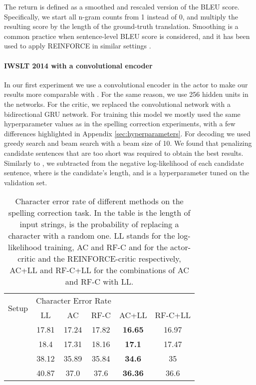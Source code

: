 \documentclass{article} \usepackage{iclr2017_conference,times}
\begin{document}
The return is defined as a smoothed and rescaled version of the BLEU score. Specifically,
we start all n-gram counts from 1 instead of 0, and multiply the resulting score
by the length of the ground-truth translation. Smoothing is a common practice when sentence-level
BLEU score is considered, and it has been used to apply REINFORCE in similar settings
\citep{ranzato2015sequence}.

\paragraph{IWSLT 2014 with a convolutional encoder}

In our first experiment we use a convolutional encoder in the actor to make our results more comparable with \citet{ranzato2015sequence}.
For the same reason, we use 256 hidden units in the  networks.
For the critic, we replaced the convolutional network with a bidirectional GRU network.
For training this model we mostly used the same hyperparameter values as in the spelling 
correction experiments, with a few differences highlighted in Appendix \ref{sec:hyperparameters}.
For decoding we used greedy search and beam search with a beam size of 10. We
found that penalizing
 candidate sentences that are too short was required to
obtain the best results. Similarly to \citep{hannun2014first},
 we subtracted
 from the negative log-likelihood of each candidate
 sentence, where
 is the candidate's length, and  is a hyperparameter
 tuned on the
validation set.


\begin{table}\centering
    \caption{Character error rate of different methods on the spelling correction task.
        In the table  is the length of input strings,  
        is the probability of replacing a character with a random one.
        LL stands for the log-likelihood training, AC and RF-C and for the actor-critic and the
        REINFORCE-critic respectively, AC+LL and RF-C+LL for the combinations of AC and RF-C with LL.}
    \begin{tabular}{l | c | c | c | c | c}
        \multirow{2}{*}{Setup} & \multicolumn{3}{|c}{Character Error Rate} \\
                               & LL & AC & RF-C & AC+LL & RF-C+LL \\
        \hline\hline
          & 17.81 & 17.24 & 17.82 & \textbf{16.65} & 16.97 \\
          & 18.4  & 17.31 & 18.16 & \textbf{17.1} & 17.47 \\
          & 38.12 & 35.89 & 35.84 & \textbf{34.6} & 35 \\
          & 40.87 & 37.0 & 37.6 & \textbf{36.36} & 36.6 
    \end{tabular}
    \label{tab:spelling}
\end{table}
\end{document}

